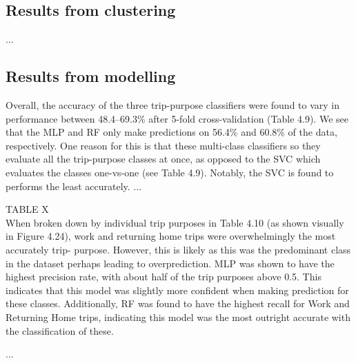 \subsection{Results from clustering}
...

\subsection{Results  from modelling}
Overall, the accuracy of the three trip-purpose classifiers were found to vary in performance between 48.4–69.3\% after 5-fold cross-validation (Table 4.9). We see that the MLP and RF only make predictions on 56.4\% and 60.8\% of the data, respectively. One reason for this is that these multi-class classifiers so they evaluate all the trip-purpose classes at once, as opposed to the SVC which evaluates the classes one-vs-one (see Table 4.9). Notably, the SVC is found to performs the least accurately.
...

TABLE X
\\ 

When broken down by individual trip purposes in Table 4.10 (as shown visually in Figure 4.24), work and returning home trips were overwhelmingly the most accurately trip- purpose. However, this is likely as this was the predominant class in the dataset perhaps leading to overprediction. MLP was shown to have the highest precision rate, with about half of the trip purposes above 0.5. This indicates that this model was slightly more confident when making prediction for these classes. Additionally, RF was found to have the highest recall for Work and Returning Home trips, indicating this model was the most outright accurate with the classification of these.

...